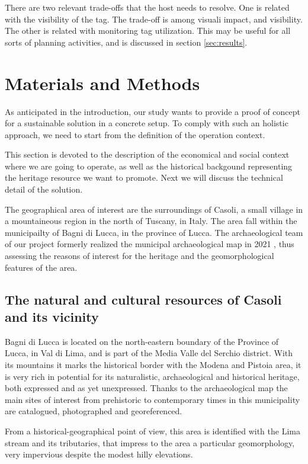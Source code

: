 \documentclass[sustainability,article,submit,pdftex,moreauthors]{Definitions/mdpi}
\begin{document}
There are two relevant trade-offs that the host needs to resolve. One is related with the visibility of the tag. The trade-off is among visuali impact, and visibility. The other is related with monitoring tag utilization. This may be useful for all sorts of planning activities, and is discussed in section \ref{sec:results}.

\section{Materials and Methods}

As anticipated in the introduction, our study wants to provide a proof of concept for a sustainable solution in a concrete setup. To comply with such an holistic approach, we need to start from the definition of the operation context.

This section is devoted to the description of the economical and social context where we are going to operate, as well as the historical backgound representing the heritage resource we want to promote. Next we will discuss the technical detail of the solution.

The geographical area of interest are the surroundings of Casoli, a small village in a mountaineous region in the north of Tuscany, in Italy. The area fall within the municipailty of Bagni di Lucca, in the province of Lucca. The archaeological team of our project formerly realized the municipal archaeological map in 2021 \cite{letizia2021}, thus assessing the reasons of interest for the heritage and the geomorphological features of the area.

\subsection{The natural and cultural resources of Casoli and its vicinity}

Bagni di Lucca is located on the north-eastern boundary of the Province of Lucca, in Val di Lima, and is part of the Media Valle del Serchio district. With its mountains it marks the historical border with the Modena and Pistoia area, it is very rich in potential for its naturalistic, archaeological and historical heritage, both expressed and as yet unexpressed. Thanks to the archaeological map the main sites of interest from prehistoric to contemporary times in this municipality are catalogued, photographed and georeferenced.

From a historical-geographical point of view, this area is identified with the Lima stream and its tributaries, that impress to the area a particular geomorphology, very impervious despite the modest hilly elevations.
\end{document}
